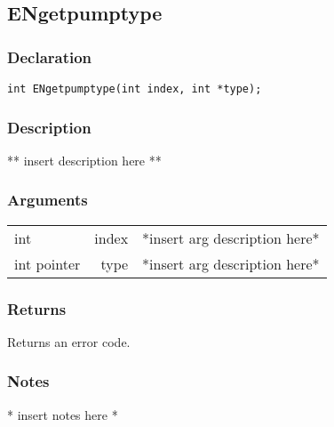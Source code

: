 \subsection{ENgetpumptype}
\subsubsection{Declaration}
\begin{lstlisting}
int ENgetpumptype(int index, int *type);
\end{lstlisting}
\subsubsection{Description}
** insert description here **
\subsubsection{Arguments}
\begin{tabular}{l r p{11cm} }
int&index&*insert arg description here* \\[6pt]
int pointer&type&*insert arg description here* \\[6pt]
\end{tabular}
\subsubsection{Returns}
Returns an error code.
\subsubsection{Notes}
* insert notes here *